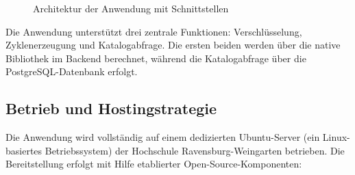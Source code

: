 \documentclass[12pt, ngerman, a4paper, numbers=noenddot]{article}
\begin{document}
\begin{figure}[H]
	\centering
	\caption{Architektur der Anwendung mit Schnittstellen}
	\label{fig:architektur-schnittstellen}
\end{figure}


Die Anwendung unterstützt drei zentrale Funktionen: Verschlüsselung, Zyklenerzeugung und Katalogabfrage. 
Die ersten beiden werden über die native Bibliothek im Backend berechnet, während die Katalogabfrage über die PostgreSQL-Datenbank erfolgt.

\subsection{Betrieb und Hostingstrategie}

Die Anwendung wird vollständig auf einem dedizierten Ubuntu-Server (ein Linux-basiertes Betriebssystem) der Hochschule Ravensburg-Weingarten betrieben. Die Bereitstellung erfolgt mit Hilfe etablierter Open-Source-Komponenten:
\end{document}
